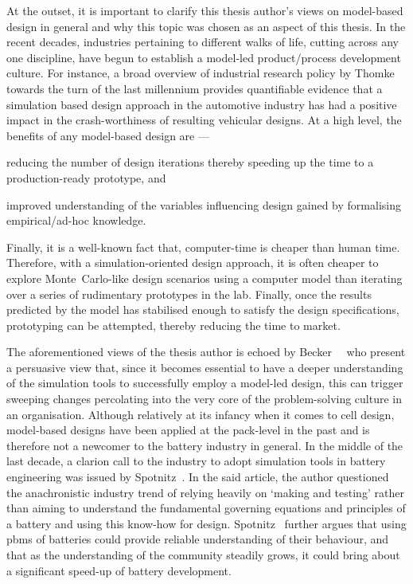 At  the  outset, it  is  important  to clarify  this  thesis  author's views  on
model-based design in general and why this topic was chosen as an aspect of this
thesis.  In  the  recent  decades,  industries  pertaining  to  different  walks
of  life,  cutting  across  any  one  discipline,  have  begun  to  establish  a
model-led product/process development culture. For instance, a broad overview of
industrial  research  policy by  Thomke~\cite{Thomke1998}  towards  the turn  of
the  last millennium  provides  quantifiable evidence  that  a simulation  based
design approach  in the  automotive industry  has had a  positive impact  in the
crash-worthiness of resulting  vehicular designs. At a high  level, the benefits
of any model-based design are ---
\begin{enumerate*}[label=\itshape\alph*\upshape)]
    \item reducing the number of design iterations thereby speeding up the time to a production-ready prototype, and
    \item improved understanding of the variables influencing design gained by formalising empirical/ad-hoc knowledge.
\end{enumerate*}
Finally, it is a well-known fact that, computer-time is cheaper than human time.
Therefore, with  a simulation-oriented design  approach, it is often  cheaper to
explore Monte~Carlo-like design scenarios  using a computer model than iterating
over  a  series  of  rudimentary  prototypes  in  the  lab.  Finally,  once  the
results  predicted by  the model  has stabilised  enough to  satisfy the  design
specifications,  prototyping can  be  attempted, thereby  reducing  the time  to
market.

The   aforementioned    views   of    the   thesis    author   is    echoed   by
Becker~\etal~\cite{Becker2005}  who  present  a   persuasive  view  that,  since
it  becomes  essential  to  have   a  deeper  understanding  of  the  simulation
tools  to successfully  employ a  model-led  design, this  can trigger  sweeping
changes percolating  into the  very core  of the  problem-solving culture  in an
organisation. Although relatively  at its infancy when it comes  to cell design,
model-based  designs have  been applied  at the  pack-level in  the past  and is
therefore not a  newcomer to the battery  industry in general. In  the middle of
the last  decade, a clarion  call to the industry  to adopt simulation  tools in
battery  engineering was  issued  by Spotnitz~\cite{Spotnitz2005}.  In the  said
article,  the author  questioned  the anachronistic  industry  trend of  relying
heavily on `making and testing' rather than aiming to understand the fundamental
governing equations  and principles  of a  battery and  using this  know-how for
design. Spotnitz~\cite{Spotnitz2005}  further argues  that using  \glspl{pbm} of
batteries could provide  reliable understanding of their behaviour,  and that as
the  understanding of  the  community steadily  grows, it  could  bring about  a
significant speed-up of battery development.

